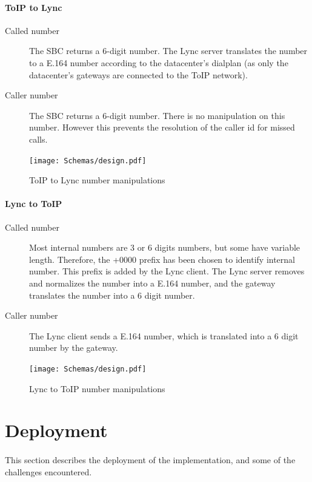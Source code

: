 	\paragraph{ToIP to Lync}
	\begin{description}
		\item[Called number] The SBC returns a 6-digit number. The Lync server translates the number to a E.164 number according to the datacenter's dialplan (as only the datacenter's gateways are connected to the ToIP network).
		\item[Caller number] The SBC returns a 6-digit number. There is no manipulation on this number. However this prevents the resolution of the caller id for missed calls.
	\end{description}
	\begin{figure}[H]
		\centering
		\texttt{[image: Schemas/design.pdf]}
		\caption{ToIP to Lync number manipulations}
		\label{fig:case_toip_to_lync}
	\end{figure}

	\paragraph{Lync to ToIP}
	\begin{description}
		\item[Called number] Most internal numbers are 3 or 6 digits numbers, but some have variable length. Therefore, the +0000 prefix has been chosen to identify internal number. This prefix is added by the Lync client. The Lync server removes and normalizes the number into a E.164 number, and the gateway translates the number into a 6 digit number.
		\item[Caller number] The Lync client sends a E.164 number, which is translated into a 6 digit number by the gateway.
	\end{description}
	\begin{figure}[H]
		\centering
		\texttt{[image: Schemas/design.pdf]}
		\caption{Lync to ToIP number manipulations}
		\label{fig:case_lync_to_toip}
	\end{figure}
	

\section{Deployment}

\paragraph{}
This section describes the deployment of the implementation, and some of the challenges encountered.

